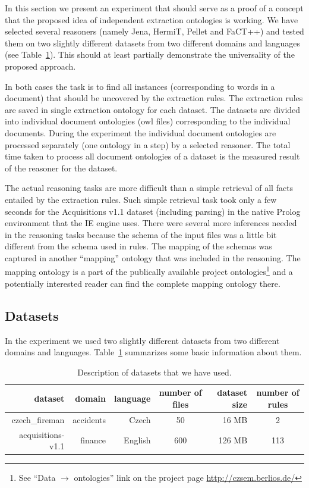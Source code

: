 In this section we present an experiment that should serve as a proof of a concept that the proposed idea of independent extraction ontologies is working. We have selected several reasoners (namely Jena, HermiT, Pellet and FaCT++) and tested them on two slightly different datasets from two different domains and languages (see Table~\ref{tab:datasets}). This should at least partially demonstrate the universality of the proposed approach.

In both cases the task is to find all instances (corresponding to words in a document) that should be uncovered by the extraction rules. The extraction rules are saved in single extraction ontology for each dataset. The datasets are divided into individual document ontologies (owl files) corresponding to the individual documents. During the experiment the individual document ontologies are processed separately (one ontology in a step) by a selected reasoner. The total time taken to process all document ontologies of a dataset is the measured result of the reasoner for the dataset.

The actual reasoning tasks are more difficult than a simple retrieval of all facts entailed by the extraction rules. Such simple retrieval task took only a few seconds for the Acquisitions v1.1 dataset (including parsing) in the native Prolog environment that the IE engine uses. There were several more inferences needed in the reasoning tasks because the schema of the input files was a little bit different from the schema used in rules. The mapping of the schemas was captured in another ``mapping'' ontology that was included in the reasoning. The mapping ontology is a part of the publically available project ontologies\footnote{See ``Data $\rightarrow$ ontologies'' link on the project page \url{http://czsem.berlios.de/}} and a potentially interested reader can find the complete mapping ontology there.


\subsection{Datasets} \label{sec:ch70_datasets}

In the experiment we used two slightly different datasets from two different domains and languages.  Table~\ref{tab:datasets} summarizes some basic information about them.

\begin{table}
\centering
\begin{tabular}{|r||r|r|c|r|c|}
\hline
dataset & domain & language & number of files & dataset size & number of rules\\
\hline
\hline
czech\_fireman & accidents & Czech & 50 & 16 MB & 2\\
\hline
acquisitions-v1.1 & finance & English & 600 & 126 MB & 113\\
\hline
\end{tabular}
\caption{Description of datasets that we have used.}
\label{tab:datasets}
\end{table}


